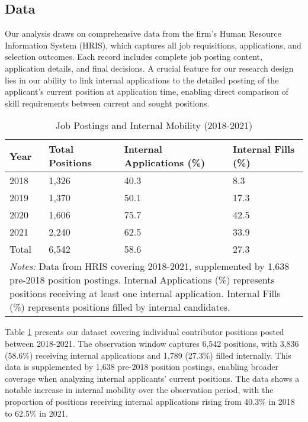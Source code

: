 \subsection{Data}

Our analysis draws on comprehensive data from the firm's Human Resource Information System (HRIS), which captures all job requisitions, applications, and selection outcomes. Each record includes complete job posting content, application details, and final decisions. A crucial feature for our research design lies in our ability to link internal applications to the detailed posting of the applicant's current position at application time, enabling direct comparison of skill requirements between current and sought positions.

\begin{table}[t]
    \caption{Job Postings and Internal Mobility (2018-2021)}
    \begin{tabularx}{\textwidth}{@{}lXXX@{}}
    \toprule
    Year & Total Positions & Internal Applications (\%) & Internal Fills (\%) \\
    \midrule
    2018 & 1,326 & 40.3 & 8.3 \\
    2019 & 1,370 & 50.1 & 17.3 \\
    2020 & 1,606 & 75.7 & 42.5 \\
    2021 & 2,240 & 62.5 & 33.9 \\
    \midrule
    Total & 6,542 & 58.6 & 27.3 \\
    \bottomrule
    \multicolumn{4}{p{\textwidth}}{\footnotesize \textit{Notes:} Data from HRIS covering 2018-2021, supplemented by 1,638 pre-2018 position postings. Internal Applications (\%) represents positions receiving at least one internal application. Internal Fills (\%) represents positions filled by internal candidates.} \\
    \end{tabularx}
    \label{tab:summary}
\end{table}

Table \ref{tab:summary} presents our dataset covering individual contributor positions posted between 2018-2021. The observation window captures 6,542 positions, with 3,836 (58.6\%) receiving internal applications and 1,789 (27.3\%) filled internally. This data is supplemented by 1,638 pre-2018 position postings, enabling broader coverage when analyzing internal applicants' current positions. The data shows a notable increase in internal mobility over the observation period, with the proportion of positions receiving internal applications rising from 40.3\% in 2018 to 62.5\% in 2021.

